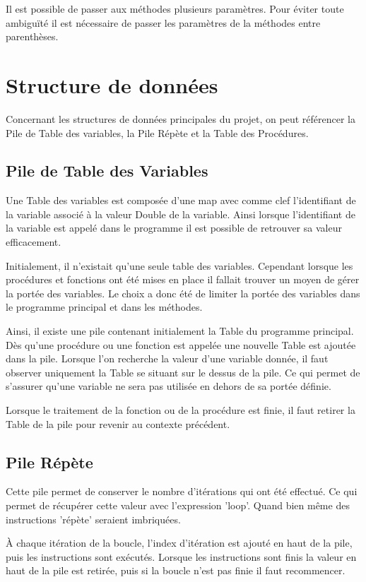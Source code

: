 \documentclass[a4paper,11pt]{article}
\begin{document}
Il est possible de passer aux méthodes plusieurs paramètres. Pour éviter toute ambiguïté il est nécessaire de passer les paramètres de la méthodes entre parenthèses.  




\section{Structure de données}
Concernant les structures de données principales du projet, on peut référencer la Pile de Table des variables, la Pile Répète et la Table des Procédures.

\subsection{Pile de Table des Variables}
Une Table des variables est composée d'une map avec comme clef l'identifiant de la variable associé à la valeur Double de la variable. Ainsi lorsque l'identifiant de la variable est appelé dans le programme il est possible de retrouver sa valeur efficacement.

Initialement, il n'existait qu'une seule table des variables. Cependant lorsque les procédures et fonctions ont été mises en place il fallait trouver un moyen de gérer la portée des variables.
Le choix a donc été de limiter la portée des variables dans le programme principal et dans les méthodes. 

Ainsi, il existe une pile contenant initialement la Table du programme principal. Dès qu'une procédure ou une fonction est appelée une nouvelle Table est ajoutée dans la pile.
Lorsque l'on recherche la valeur d'une variable donnée, il faut observer uniquement la Table se situant sur le dessus de la pile. Ce qui permet de s'assurer qu'une variable ne sera pas utilisée en dehors de sa portée définie.

Lorsque le traitement de la fonction ou de la procédure est finie, il faut retirer la Table de la pile pour revenir au contexte précédent.


\subsection{Pile Répète}
Cette pile permet de conserver le nombre d'itérations qui ont été effectué. Ce qui permet de récupérer cette valeur avec l'expression 'loop'. Quand bien même des instructions 'répète' seraient imbriquées.

À chaque itération de la boucle, l'index d'itération est ajouté en haut de la pile, puis les instructions sont exécutés. Lorsque les instructions sont finis la valeur en haut de la pile est retirée, puis si la boucle n'est pas finie il faut recommencer. 
\end{document}
